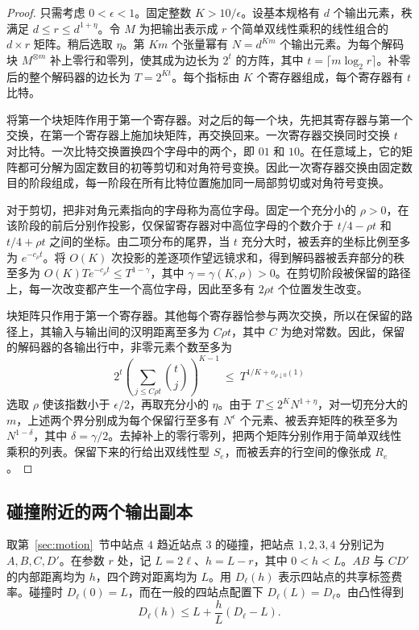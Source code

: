 \begin{proof}
只需考虑 \(0<\epsilon<1\)。固定整数 \(K>10/\epsilon\)。设基本规格有 \(d\) 个输出元素，秩满足 \(d\le r\le d^{1+\eta}\)。令 \(M\) 为把输出表示成 \(r\) 个简单双线性乘积的线性组合的 \(d\times r\) 矩阵。稍后选取 \(\eta\)。第 \(Km\) 个张量幂有 \(N=d^{Km}\) 个输出元素。为每个解码块 \(M^{\otimes m}\) 补上零行和零列，使其成为边长为 \(2^t\) 的方阵，其中 \(t=\lceil m\log_2 r\rceil\)。补零后的整个解码器的边长为 \(T=2^{Kt}\)。每个指标由 \(K\) 个寄存器组成，每个寄存器有 \(t\) 比特。

将第一个块矩阵作用于第一个寄存器。对之后的每一个块，先把其寄存器与第一个交换，在第一个寄存器上施加块矩阵，再交换回来。一次寄存器交换同时交换 \(t\) 对比特。一次比特交换置换四个字母中的两个，即 \(01\) 和 \(10\)。在任意域上，它的矩阵都可分解为固定数目的初等剪切和对角符号变换。因此一次寄存器交换由固定数目的阶段组成，每一阶段在所有比特位置施加同一局部剪切或对角符号变换。

对于剪切，把非对角元素指向的字母称为高位字母。固定一个充分小的 \(\rho>0\)，在该阶段的前后分别作投影，仅保留寄存器对中高位字母的个数介于 \(t/4-\rho t\) 和 \(t/4+\rho t\) 之间的坐标。由二项分布的尾界，当 \(t\) 充分大时，被丢弃的坐标比例至多为 \(e^{-c_\rho t}\)。将 \(O(K)\) 次投影的差逐项作望远镜求和，得到解码器被丢弃部分的秩至多为 \(O(K)Te^{-c_\rho t}\le T^{1-\gamma}\)，其中 \(\gamma=\gamma(K,\rho)>0\)。在剪切阶段被保留的路径上，每一次改变都产生一个高位字母，因此至多有 \(2\rho t\) 个位置发生改变。

块矩阵只作用于第一个寄存器。其他每个寄存器恰参与两次交换，所以在保留的路径上，其输入与输出间的汉明距离至多为 \(C\rho t\)，其中 \(C\) 为绝对常数。因此，保留的解码器的各输出行中，非零元素个数至多为
\[
       2^t\left(\sum_{j\le C\rho t}\binom{t}{j}\right)^{K-1}
       \ \le\ T^{1/K+o_{\rho\downarrow0}(1)}
\]
选取 \(\rho\) 使该指数小于 \(\epsilon/2\)，再取充分小的 \(\eta\)。由于 \(T\le 2^K N^{1+\eta}\)，对一切充分大的 \(m\)，上述两个界分别成为每个保留行至多有 \(N^\epsilon\) 个元素、被丢弃矩阵的秩至多为 \(N^{1-\delta}\)，其中 \(\delta=\gamma/2\)。去掉补上的零行零列，把两个矩阵分别作用于简单双线性乘积的列表。保留下来的行给出双线性型 \(S_e\)，而被丢弃的行空间的像张成 \(R_e\)。
\end{proof}

\subsection{碰撞附近的两个输出副本}

取第~\ref{sec:motion}~节中站点 \(4\) 趋近站点 \(3\) 的碰撞，把站点 \(1,2,3,4\) 分别记为 \(A,B,C,D'\)。在参数 \(r\) 处，记 \(L=2\ell\)、\(h=L-r\)，其中 \(0<h<L\)。\(AB\) 与 \(CD'\) 的内部距离均为 \(h\)，四个跨对距离均为 \(L\)。用 \(D_\ell(h)\) 表示四站点的共享标签费率。碰撞时 \(D_\ell(0)=L\)，而在一般的四站点配置下 \(D_\ell(L)=D_\ell\)。由凸性得到
\[
                   D_\ell(h)\le L+\frac hL(D_\ell-L).
\]

